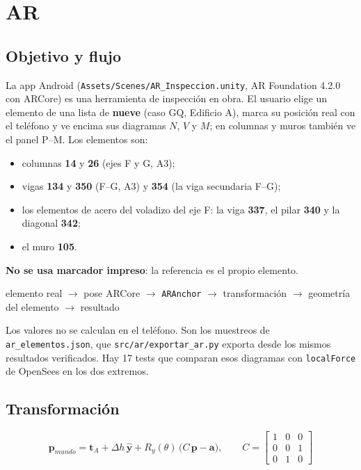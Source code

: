 \documentclass[11pt,a4paper]{article}
\begin{document}
\section{AR}

\subsection{Objetivo y flujo}

La app Android (\texttt{Assets/Scenes/AR\_Inspeccion.unity}, AR Foundation 4.2.0
con ARCore) es una herramienta de inspección en obra. El usuario elige un
elemento de una lista de \textbf{nueve} (caso GQ, Edificio A), marca su
posición real con el teléfono y ve encima sus diagramas $N$, $V$ y $M$; en
columnas y muros también ve el panel P--M. Los elementos son:
\begin{itemize}
  \item columnas \textbf{14} y \textbf{26} (ejes F y G, A3);
  \item vigas \textbf{134} y \textbf{350} (F--G, A3) y \textbf{354} (la viga
        secundaria F--G);
  \item los elementos de acero del voladizo del eje F: la viga \textbf{337}, el
        pilar \textbf{340} y la diagonal \textbf{342};
  \item el muro \textbf{105}.
\end{itemize} \textbf{No se usa marcador
impreso}: la referencia es el propio elemento.

\begin{center}
elemento real $\to$ pose ARCore $\to$ \texttt{ARAnchor} $\to$ transformación
$\to$ geometría del elemento $\to$ resultado
\end{center}

Los valores no se calculan en el teléfono. Son los muestreos de
\texttt{ar\_elementos.json}, que \texttt{src/ar/exportar\_ar.py} exporta desde
los mismos resultados verificados. Hay 17 tests que comparan esos diagramas con
\texttt{localForce} de OpenSees en los dos extremos.

\subsection{Transformación}

\[
\mathbf{p}_{mundo} = \mathbf{t}_A + \Delta h\,\hat{\mathbf{y}} +
R_y(\theta)\,\big(C\,\mathbf{p} - \mathbf{a}\big), \qquad
C = \begin{bmatrix}1&0&0\\0&0&1\\0&1&0\end{bmatrix}
\]
\end{document}
